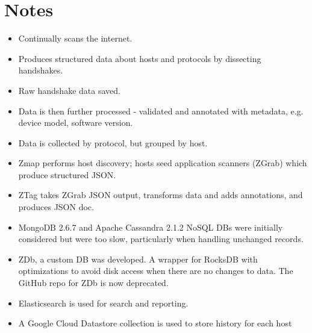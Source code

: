 \section*{Notes} %
\begin{itemize}
	\item Continually scans the internet.
	\item Produces structured data about hosts and protocols by dissecting handshakes.
	\item Raw handshake data saved.
	\item Data is then further processed - validated and annotated with metadata, e.g. device model, software version.
	\item Data is collected by protocol, but grouped by host.
	\item Zmap performs host discovery; hosts seed application scanners (ZGrab) which produce structured JSON.
	\item ZTag takes ZGrab JSON output, transforms data and adds annotations, and produces JSON doc.
	\item MongoDB 2.6.7 and Apache Cassandra 2.1.2 NoSQL DBs were initially considered but were too slow, particularly when handling unchanged records.
	\item ZDb, a custom DB was developed. A wrapper for RocksDB with optimizations to avoid disk access when there are no changes to data. The GitHub repo for ZDb is now deprecated.
	\item Elasticsearch is used for search and reporting. \cite{Elasticsearch}
	\item A Google Cloud Datastore collection is used to store history for each host
\end{itemize}

